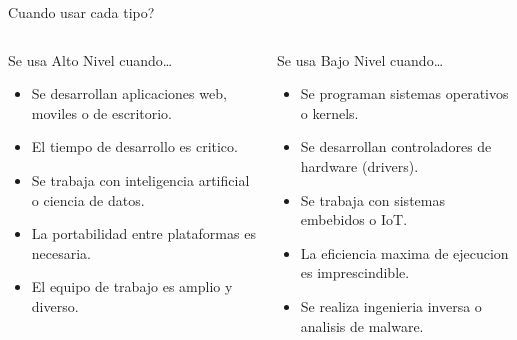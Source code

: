 \documentclass[10pt, aspectratio=169]{beamer}
\begin{document}
	\begin{frame}{Cuando usar cada tipo?}
		\begin{columns}
			\begin{block}{Se usa Alto Nivel cuando\ldots}
				\begin{itemize}
					\item Se desarrollan aplicaciones web, moviles o de escritorio.
					\item El tiempo de desarrollo es critico.
					\item Se trabaja con inteligencia artificial o ciencia de datos.
					\item La portabilidad entre plataformas es necesaria.
					\item El equipo de trabajo es amplio y diverso.
				\end{itemize}
			\end{block}
			\begin{block}{Se usa Bajo Nivel cuando\ldots}
				\begin{itemize}
					\item Se programan sistemas operativos o kernels.
					\item Se desarrollan controladores de hardware (drivers).
					\item Se trabaja con sistemas embebidos o IoT.
					\item La eficiencia maxima de ejecucion es imprescindible.
					\item Se realiza ingenieria inversa o analisis de malware.
				\end{itemize}
			\end{block}
		\end{columns}
	\end{frame}
	
\end{document}
